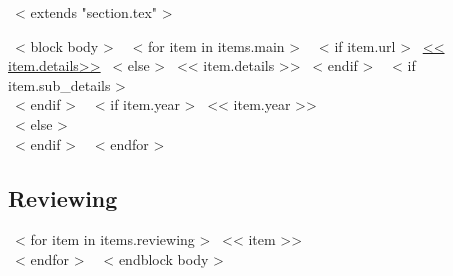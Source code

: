 ~< extends "section.tex" >~

~< block body >~
  ~< for item in items.main >~
    ~< if item.url >~
      \href{<< item.url >>}{<< item.details>>}
    ~< else >~
      << item.details >>
    ~< endif >~
    ~< if item.sub_details >~
      \,\, {\scriptsize
        \color{gray}{<< item.sub_details >>}
      } \\[2mm]
    ~< endif >~
    ~< if item.year >~
        \hfill << item.year >> \\
    ~< else >~
       \\[2mm]
    ~< endif >~
  ~< endfor >~

  \subsection{Reviewing}
  ~< for item in items.reviewing >~
  << item >> \\
  ~< endfor >~
~< endblock body >~